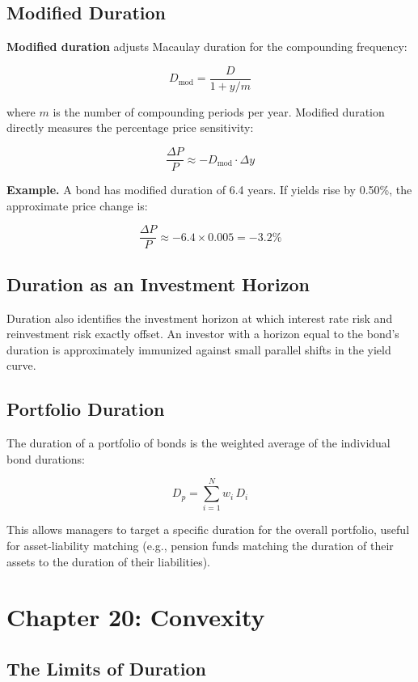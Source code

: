 \documentclass[11pt,letterpaper]{report}
\begin{document}
\section{Modified Duration}


\textbf{Modified duration} adjusts Macaulay duration for the compounding frequency:

$$D_{\text{mod}} = \frac{D}{1 + y/m}$$

where $m$ is the number of compounding periods per year.  Modified duration directly measures the percentage price sensitivity:

$$\frac{\Delta P}{P} \approx -D_{\text{mod}} \cdot \Delta y$$

\textbf{Example.}  A bond has modified duration of 6.4 years.  If yields rise by 0.50\%, the approximate price change is:

$$\frac{\Delta P}{P} \approx -6.4 \times 0.005 = -3.2\%$$

\section{Duration as an Investment Horizon}


Duration also identifies the investment horizon at which interest rate risk and reinvestment risk exactly offset.  An investor with a horizon equal to the bond's duration is approximately immunized against small parallel shifts in the yield curve.

\section{Portfolio Duration}


The duration of a portfolio of bonds is the weighted average of the individual bond durations:

$$D_p = \sum_{i=1}^{N} w_i \, D_i$$

This allows managers to target a specific duration for the overall portfolio, useful for asset-liability matching (e.g., pension funds matching the duration of their assets to the duration of their liabilities).


\chapter{Chapter 20: Convexity}


\section{The Limits of Duration}
\end{document}
